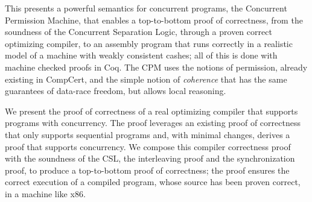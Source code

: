 
This  presents a powerful semantics for concurrent programs, the Concurrent Permission Machine, that enables a top-to-bottom proof of correctness, 
from the soundness of the Concurrent Separation Logic, through a proven correct optimizing compiler, to an assembly program that runs correctly in a realistic model of a machine with weakly consistent cashes; all of this is done with machine checked proofs in Coq. The CPM uses the notions of permission, already existing in CompCert, and the simple notion of \emph{coherence} that has the same guarantees of data-race freedom, but allows local reasoning.  

We present the proof of correctness of a real optimizing compiler that supports programs with concurrency. The proof leverages an existing proof of correctness that only supports sequential programs and, with minimal changes, derives a proof that supports concurrency. We compose this compiler correctness proof with the soundness of the CSL, the interleaving proof and the synchronization proof, to produce a top-to-bottom proof of correctness; the proof ensures the correct execution of a compiled program, whose source has been proven correct, in a machine like x86. 

%
